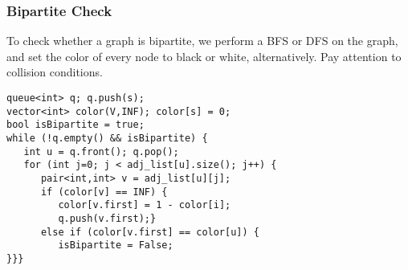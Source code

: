\documentclass{beamer}
\begin{document}
\begin{frame}
  \frametitle{Bipartite Check}
  {\smaller
  To check whether a graph is bipartite, we perform a BFS or DFS on the graph, 
  and set the color of every node to black or white, alternatively. Pay 
  attention to collision conditions.

  \begin{exampleblock}{}
\begin{verbatim}
queue<int> q; q.push(s);
vector<int> color(V,INF); color[s] = 0;
bool isBipartite = true;
while (!q.empty() && isBipartite) {
   int u = q.front(); q.pop();
   for (int j=0; j < adj_list[u].size(); j++) {
      pair<int,int> v = adj_list[u][j];
      if (color[v] == INF) {
         color[v.first] = 1 - color[i];
         q.push(v.first);}
      else if (color[v.first] == color[u]) {
         isBipartite = False; 
}}}
\end{verbatim}
  \end{exampleblock}
  }
\end{frame}
\end{document}
